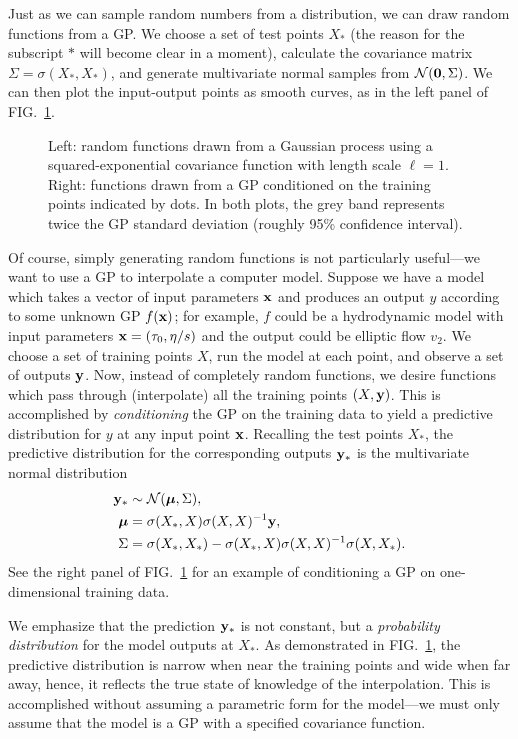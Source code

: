 \documentclass[aps,prc,reprint,amsmath]{revtex4-1}
\newcommand{\placeholderfig}[3][t]{
  \begin{figure}[#1]
    \centering
    \framebox{\parbox[c][.5\columnwidth]{\columnwidth}{
      placeholder
    }}
    \caption{\label{fig:#2}#3}
  \end{figure}
}
\begin{document}
Just as we can sample random numbers from a distribution, we can draw random functions from a GP.
We choose a set of test points $X_*$ (the reason for the subscript $*$ will become clear in a moment), calculate the covariance matrix $\Sigma = \sigma(X_*, X_*)$, and generate multivariate normal samples from $\mathcal N(\mathbf 0, \Sigma)$.
We can then plot the input-output points as smooth curves, as in the left panel of FIG.~\ref{fig:gp}.

\placeholderfig[t]{gp}{
  Left: random functions drawn from a Gaussian process using a squared-exponential covariance function with length scale $\ell = 1$.
  Right: functions drawn from a GP conditioned on the training points indicated by dots.
  In both plots, the grey band represents twice the GP standard deviation (roughly 95\% confidence interval).
}

Of course, simply generating random functions is not particularly useful---we want to use a GP to interpolate a computer model.
Suppose we have a model which takes a vector of input parameters $\mathbf x$ and produces an output $y$ according to some unknown GP $f(\mathbf x)$; for example, $f$ could be a hydrodynamic model with input parameters $\mathbf x = (\tau_0, \eta/s)$ and the output could be elliptic flow $v_2$.
We choose a set of training points $X$, run the model at each point, and observe a set of outputs $\mathbf y$.
Now, instead of completely random functions, we desire functions which pass through (interpolate) all the training points $(X, \mathbf y)$.
This is accomplished by \emph{conditioning} the GP on the training data to yield a predictive distribution for $y$ at any input point $\mathbf x$.
Recalling the test points $X_*$, the predictive distribution for the corresponding outputs $\mathbf y_*$ is the multivariate normal distribution
\begin{equation}
\begin{aligned}
  \mathbf y_* &\sim \mathcal N(\boldsymbol\mu, \Sigma), \\
  \boldsymbol\mu &= \sigma(X_*, X)\sigma(X, X)^{-1}\mathbf y, \\
  \Sigma &= \sigma(X_*,X_*) - \sigma(X_*,X)\sigma(X,X)^{-1}\sigma(X,X_*).
\end{aligned}
\end{equation}
See the right panel of FIG.~\ref{fig:gp} for an example of conditioning a GP on one-dimensional training data.

We emphasize that the prediction $\mathbf y_*$ is not constant, but a \emph{probability distribution} for the model outputs at $X_*$.
As demonstrated in FIG.~\ref{fig:gp}, the predictive distribution is narrow when near the training points and wide when far away, hence, it reflects the true state of knowledge of the interpolation.
This is accomplished without assuming a parametric form for the model---we must only assume that the model is a GP with a specified covariance function.
\end{document}

